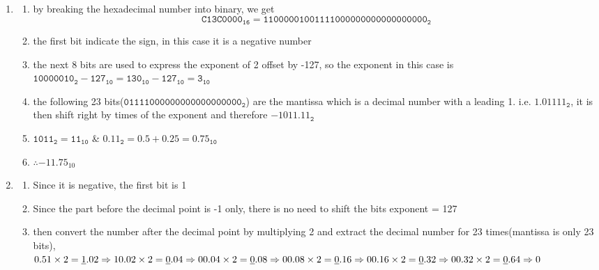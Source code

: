 \documentclass[12pt, a4paper]{article}
\begin{document}
\begin{ans}
    \begin{enumerate}
        \item \begin{enumerate}
                \item by breaking the hexadecimal number into binary, we get $$\mathtt{C13C0000_{16}}=\mathtt{1100 0001 0011 1100 0000 0000 0000 0000_2}$$
                \item the first bit indicate the sign, in this case it is a negative number
                \item the next 8 bits are used to express the exponent of 2 offset by -127, so the exponent in this case is $\mathtt{10000010_2 - 127_{10} = 130_{10} - 127_{10} = 3_{10}}$ 
                \item the following 23 bits($\mathtt{011 1100 0000 0000 0000 0000_2}$) are the mantissa which is a decimal number with a leading 1. i.e. $\mathtt{1.01111_2}$, it is then shift right by times of the exponent and therefore $\mathtt{-1011.11_2}$
                \item $\mathtt{1011_2 = 11_{10}}$ \& $\mathtt{0.11_2 = 0.5 + 0.25 = 0.75_{10}}$ 
                \item $\therefore-11.75_{10}$
            \end{enumerate}
        \item \begin{enumerate}
                \item Since it is negative, the first bit is 1
                \item Since the part before the decimal point is -1 only, there is no need to shift the bits exponent = 127
                \item then convert the number after the decimal point by multiplying 2 and extract the decimal number for 23 times(mantissa is only 23 bits), \\
                    \begin{math}
                        0.51 \times 2 = \underline{1}.02 \Rightarrow 1 \hfill 
                        0.02 \times 2 = \underline{0}.04 \Rightarrow 0 \hfill 
                        0.04 \times 2 = \underline{0}.08 \Rightarrow 0\\
                        0.08 \times 2 = \underline{0}.16 \Rightarrow 0 \hfill
                        0.16 \times 2 = \underline{0}.32 \Rightarrow 0 \hfill
                        0.32 \times 2 = \underline{0}.64 \Rightarrow 0\\

\end{math}
\end{enumerate}
\end{enumerate}
\end{ans}
\end{document}
